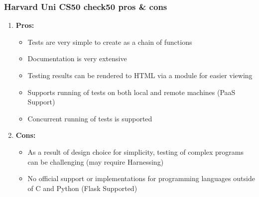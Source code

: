 \documentclass[xcolor]{beamer}
\begin{document}
\begin{frame}
	\frametitle{Harvard Uni CS50 check50 pros \& cons}
	\begin{enumerate}
		\item \textbf{Pros:}
		\begin{itemize}
			\item Tests are very simple to create as a chain of functions
			\item Documentation is very extensive
			\item Testing results can be rendered to HTML via a module for easier viewing
			\item Supports running of tests on both local and remote machines (PaaS Support)
			\item Concurrent running of tests is supported 
		\end{itemize}
			\pause
		\item \textbf{Cons:}
		\begin{itemize}
			\item As a result of design choice for simplicity, testing of complex programs can be challenging (may require Harnessing)
			\item No official support or implementations for programming languages outside of C and Python (Flask Supported)
		\end{itemize}
	\end{enumerate}
\end{frame}
\end{document}
